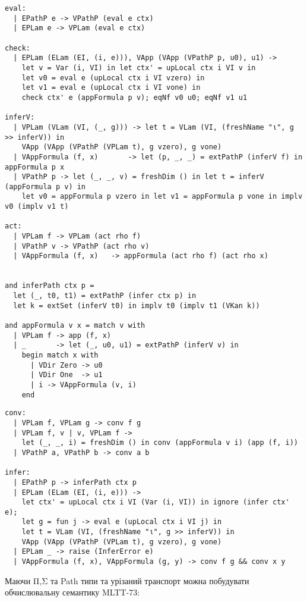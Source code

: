 \begin{lstlisting}
eval:
  | EPathP e -> VPathP (eval e ctx)
  | EPLam e -> VPLam (eval e ctx)
  
check:
  | EPLam (ELam (EI, (i, e))), VApp (VApp (VPathP p, u0), u1) ->
    let v = Var (i, VI) in let ctx' = upLocal ctx i VI v in
    let v0 = eval e (upLocal ctx i VI vzero) in
    let v1 = eval e (upLocal ctx i VI vone) in
    check ctx' e (appFormula p v); eqNf v0 u0; eqNf v1 u1

inferV:
  | VPLam (VLam (VI, (_, g))) -> let t = VLam (VI, (freshName "ι", g >> inferV)) in
    VApp (VApp (VPathP (VPLam t), g vzero), g vone)
  | VAppFormula (f, x)       -> let (p, _, _) = extPathP (inferV f) in appFormula p x
  | VPathP p -> let (_, _, v) = freshDim () in let t = inferV (appFormula p v) in
    let v0 = appFormula p vzero in let v1 = appFormula p vone in implv v0 (implv v1 t)

act:
  | VPLam f -> VPLam (act rho f)
  | VPathP v -> VPathP (act rho v)
  | VAppFormula (f, x)   -> appFormula (act rho f) (act rho x)


and inferPath ctx p =
  let (_, t0, t1) = extPathP (infer ctx p) in
  let k = extSet (inferV t0) in implv t0 (implv t1 (VKan k))

and appFormula v x = match v with
  | VPLam f -> app (f, x)
  | _       -> let (_, u0, u1) = extPathP (inferV v) in
    begin match x with
      | VDir Zero -> u0
      | VDir One  -> u1
      | i -> VAppFormula (v, i)
    end
\end{lstlisting}

\newpage
\begin{lstlisting}
conv:
  | VPLam f, VPLam g -> conv f g
  | VPLam f, v | v, VPLam f ->
    let (_, _, i) = freshDim () in conv (appFormula v i) (app (f, i))
  | VPathP a, VPathP b -> conv a b

infer:
  | EPathP p -> inferPath ctx p
  | EPLam (ELam (EI, (i, e))) ->
    let ctx' = upLocal ctx i VI (Var (i, VI)) in ignore (infer ctx' e);
    let g = fun j -> eval e (upLocal ctx i VI j) in
    let t = VLam (VI, (freshName "ι", g >> inferV)) in
    VApp (VApp (VPathP (VPLam t), g vzero), g vone)
  | EPLam _ -> raise (InferError e)
  | VAppFormula (f, x), VAppFormula (g, y) -> conv f g && conv x y

\end{lstlisting}

Маючи Π,Σ та Path типи та урізаний транспорт можна
побудувати обчислювальну семантику MLTT-73:

